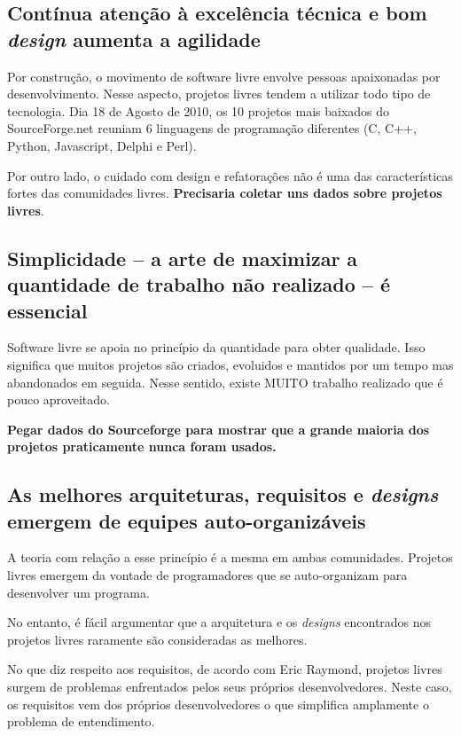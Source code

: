 
\subsection{Contínua atenção à excelência técnica e bom
  \textit{design} aumenta a agilidade}

Por construção, o movimento de software livre envolve pessoas
apaixonadas por desenvolvimento. Nesse aspecto, projetos livres tendem
a utilizar todo tipo de tecnologia.  Dia 18 de Agosto de 2010, os 10
projetos mais baixados do SourceForge.net reuniam 6 linguagens de
programação diferentes (C, C++, Python, Javascript, Delphi e Perl).

Por outro lado, o cuidado com design e refatorações não é uma das
características fortes das comunidades livres. \textbf{Precisaria
  coletar uns dados sobre projetos livres}.

\subsection{Simplicidade -- a arte de maximizar a quantidade de
  trabalho não realizado -- é essencial}

Software livre se apoia no princípio da quantidade para obter
qualidade. Isso significa que muitos projetos são criados, evoluidos e
mantidos por um tempo mas abandonados em seguida. Nesse sentido,
existe MUITO trabalho realizado que é pouco aproveitado.

\textbf{Pegar dados do Sourceforge para mostrar que a grande maioria dos projetos
  praticamente nunca foram usados.}

\subsection{As melhores arquiteturas, requisitos e \textit{designs}
  emergem de equipes auto-organizáveis}

A teoria com relação a esse princípio é a mesma em ambas
comunidades. Projetos livres emergem da vontade de programadores que
se auto-organizam para desenvolver um programa.

No entanto, é fácil argumentar que a arquitetura e os \textit{designs}
encontrados nos projetos livres raramente são consideradas as
melhores.

No que diz respeito aos requisitos, de acordo com Eric Raymond,
projetos livres surgem de problemas enfrentados pelos seus próprios
desenvolvedores. Neste caso, os requisitos vem dos próprios
desenvolvedores o que simplifica amplamente o problema de entendimento.

